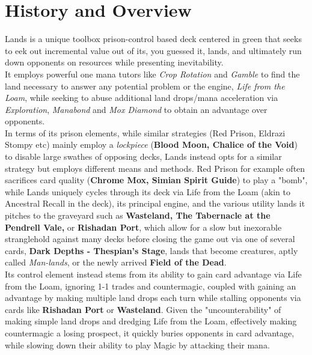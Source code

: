 \documentclass{report}
\begin{document}
\chapter{History and Overview}
Lands is a unique toolbox prison-control based deck centered in green that seeks to eek out incremental value out of its, you guessed it, lands, and ultimately run down opponents on resources while presenting inevitability.\\ It employs powerful one mana tutors like \emph{Crop Rotation} and \emph{Gamble} to find the land necessary to answer any potential problem or the engine, \emph{Life from the Loam}, while seeking to abuse additional land drops/mana acceleration via \emph{Exploration}, \emph{Manabond} and \emph{Mox Diamond} to obtain an advantage over opponents. \\
In terms of its prison elements, while similar strategies (Red Prison, Eldrazi Stompy etc) mainly employ a \emph{lockpiece} (\textbf{Blood Moon, Chalice of the Void}) to disable large swathes of opposing decks, Lands instead opts for a similar strategy but employs different means and methods. Red Prison for example often sacrifices card quality (\textbf{Chrome Mox, Simian Spirit Guide}) to play a "bomb", while Lands uniquely cycles through its deck via Life from the Loam (akin to Ancestral Recall in the deck), its principal engine, and the various utility lands it pitches to the graveyard such as \textbf{Wasteland, The Tabernacle at the Pendrell Vale,} or \textbf{Rishadan Port}, which allow for a slow but inexorable stranglehold against many decks before closing the game out via one of several cards, \textbf{Dark Depths - Thespian's Stage}, lands that become creatures, aptly called \emph{Man-lands}, or the newly arrived \textbf{Field of the Dead}.\\
Its control element instead stems from its ability to gain card advantage via Life from the Loam, ignoring 1-1 trades and countermagic, coupled with gaining an advantage by making multiple land drops each turn while stalling opponents via cards like \textbf{Rishadan Port} or \textbf{Wasteland}. Given the "uncounterability" of making simple land drops and dredging Life from the Loam, effectively making countermagic a losing prospect, it quickly buries opponents in card advantage, while slowing down their ability to play Magic by attacking their mana.
\newpage
\end{document}
